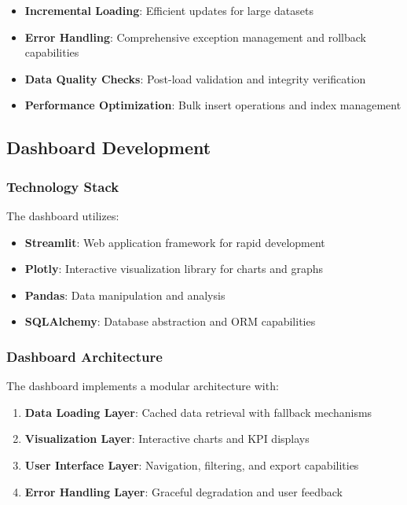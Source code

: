 \documentclass[12pt,a4paper]{article}
\begin{document}
\begin{itemize}
    \item \textbf{Incremental Loading}: Efficient updates for large datasets
    \item \textbf{Error Handling}: Comprehensive exception management and rollback capabilities
    \item \textbf{Data Quality Checks}: Post-load validation and integrity verification
    \item \textbf{Performance Optimization}: Bulk insert operations and index management
\end{itemize}

\subsection{Dashboard Development}

\subsubsection{Technology Stack}
The dashboard utilizes:

\begin{itemize}
    \item \textbf{Streamlit}: Web application framework for rapid development
    \item \textbf{Plotly}: Interactive visualization library for charts and graphs
    \item \textbf{Pandas}: Data manipulation and analysis
    \item \textbf{SQLAlchemy}: Database abstraction and ORM capabilities
\end{itemize}

\subsubsection{Dashboard Architecture}
The dashboard implements a modular architecture with:

\begin{enumerate}
    \item \textbf{Data Loading Layer}: Cached data retrieval with fallback mechanisms
    \item \textbf{Visualization Layer}: Interactive charts and KPI displays
    \item \textbf{User Interface Layer}: Navigation, filtering, and export capabilities
    \item \textbf{Error Handling Layer}: Graceful degradation and user feedback
\end{enumerate}
\end{document}
